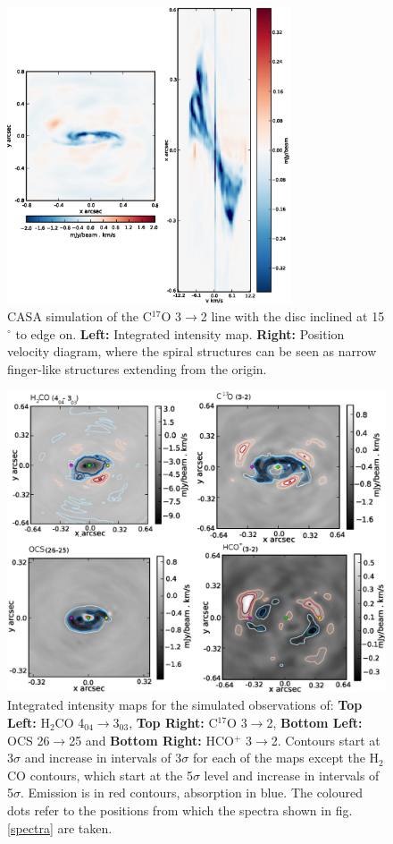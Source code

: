 \documentclass[useAMS,usenatbib]{mn2e}
\begin{document}
\begin{figure}
 \includegraphics[width=84mm]{Figures/sim/casa_C17O_15deg_all3.eps}

 \caption{CASA simulation of the C$^{17}$O 3$\rightarrow$2 line with the disc inclined at 15$^\circ$ to edge on. {\bf Left:} Integrated intensity map. {\bf Right:} Position velocity diagram, where the spiral structures can be seen as narrow finger-like structures extending from the origin.}
 \label{15deg}
\end{figure}


\begin{figure}
 \includegraphics[width=140mm]{Figures/sim/casa_all_30deg_contSub_dots.eps}
 \caption{Integrated intensity maps for the simulated observations of: {\bf Top Left:} H$_2$CO 4$_{04}\rightarrow$3$_{03}$, {\bf Top Right:} C$^{17}$O 3$\rightarrow$2, {\bf Bottom Left:} OCS 26$\rightarrow$25 and {\bf Bottom Right:} HCO$^+$ 3$\rightarrow$2. Contours start at 3$\sigma$ and increase in intervals of 3$\sigma$ for each of the maps except the H$_2$CO contours, which start at the 5$\sigma$ level and increase in intervals of 5$\sigma$. Emission is in red contours, absorption in blue. The coloured dots refer to the positions from which the spectra shown in fig. \ref{spectra} are taken.}
\label{mom0_maps}
\end{figure}
\end{document}
